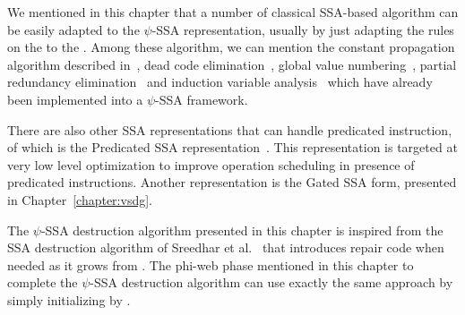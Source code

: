 We mentioned in this chapter that a number of classical SSA-based algorithm can be easily adapted to the $\psi$-SSA representation, usually by just adapting the rules on the \phifuns to the \psifuns. Among these algorithm, we can mention the constant propagation algorithm described in~\cite{WZ91}, dead code elimination~\cite{morgan98}, global value numbering~\cite{Cli95}, partial redundancy elimination~\cite{CCK+97} and induction variable analysis~\cite{Wolfe92} which have already been implemented into a $\psi$-SSA framework.

There are also other SSA representations that can handle predicated instruction, of which is the Predicated SSA representation~\cite{Carter:PACT99}. This representation is targeted at very low level optimization to improve operation scheduling in presence of predicated instructions. Another representation is the Gated SSA form, presented in Chapter~\ref{chapter:vsdg}.

The $\psi$-SSA destruction algorithm presented in this chapter is inspired from the SSA destruction algorithm of Sreedhar et al.~\cite{Sreedhar:1999:SAS} that introduces repair code when needed as it grows \phiwebs from \phifuns. The phi-web phase mentioned in this chapter to complete the $\psi$-SSA destruction algorithm can use exactly the same approach by simply initializing \phipsiwebs by \psiwebs.
